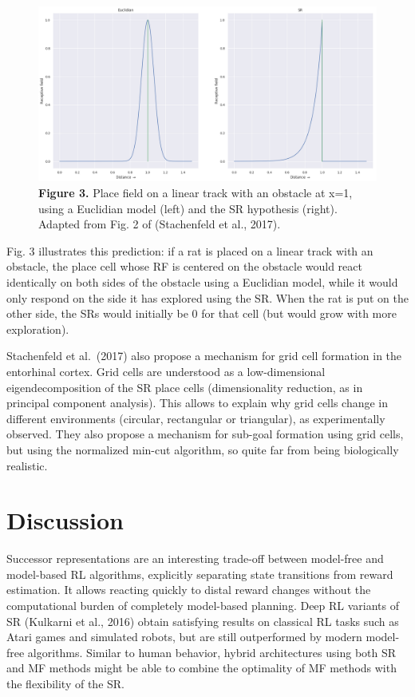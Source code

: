 \documentclass[
  11pt,
]{article}
\begin{document}
\begin{figure}
\centering
\includegraphics{img/sr_track.png}
\caption{\textbf{Figure 3.} Place field on a linear track with an
obstacle at x=1, using a Euclidian model (left) and the SR hypothesis
(right). Adapted from Fig. 2 of (Stachenfeld et al., 2017).}
\end{figure}

Fig. 3 illustrates this prediction: if a rat is placed on a linear track
with an obstacle, the place cell whose RF is centered on the obstacle
would react identically on both sides of the obstacle using a Euclidian
model, while it would only respond on the side it has explored using the
SR. When the rat is put on the other side, the SRs would initially be 0
for that cell (but would grow with more exploration).

Stachenfeld et al.~(2017) also propose a mechanism for grid cell
formation in the entorhinal cortex. Grid cells are understood as a
low-dimensional eigendecomposition of the SR place cells (dimensionality
reduction, as in principal component analysis). This allows to explain
why grid cells change in different environments (circular, rectangular
or triangular), as experimentally observed. They also propose a
mechanism for sub-goal formation using grid cells, but using the
normalized min-cut algorithm, so quite far from being biologically
realistic.

\hypertarget{discussion}{%
\section{Discussion}\label{discussion}}

Successor representations are an interesting trade-off between
model-free and model-based RL algorithms, explicitly separating state
transitions from reward estimation. It allows reacting quickly to distal
reward changes without the computational burden of completely
model-based planning. Deep RL variants of SR (Kulkarni et al., 2016)
obtain satisfying results on classical RL tasks such as Atari games and
simulated robots, but are still outperformed by modern model-free
algorithms. Similar to human behavior, hybrid architectures using both
SR and MF methods might be able to combine the optimality of MF methods
with the flexibility of the SR.
\end{document}
